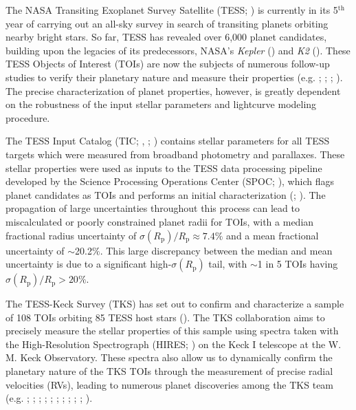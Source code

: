 \documentclass[twocolumn]{aastex63}
\begin{document}
The NASA Transiting Exoplanet Survey Satellite (TESS; \citealt{Ricker15}) is currently in its 5$^\textrm{th}$ year of carrying out an all-sky survey in search of transiting planets orbiting nearby bright stars. So far, TESS has revealed over 6,000 planet candidates, building upon the legacies of its predecessors, NASA's \textit{Kepler} (\citealt{Borucki10}) and \textit{K2} (\citealt{Howell14}). These TESS Objects of Interest (TOIs) are now the subjects of numerous follow-up studies to verify their planetary nature and measure their properties (e.g. \citealt{Kane21}; \citealt{Teske21}; \citealt{Chontos22}; \citealt{Yee22}). The precise characterization of planet properties, however, is greatly dependent on the robustness of the input stellar parameters and lightcurve modeling procedure. 

The TESS Input Catalog (TIC; \citealt{Stassun18}, \citealt{Stassun19}; \citealt{https://doi.org/10.26134/exofop3}) contains stellar parameters for all TESS targets which were measured from broadband photometry and parallaxes. These stellar properties were used as inputs to the TESS data processing pipeline developed by the Science Processing Operations Center (SPOC; \citealt{Jenkins16}), which flags planet candidates as TOIs and performs an initial characterization (\citealt{Guerrero21}; \citealt{toi}). The propagation of large uncertainties throughout this process can lead to miscalculated or poorly constrained planet radii for TOIs, with a median fractional radius uncertainty of $\sigma(R_\textrm{p})/R_\textrm{p} \approx 7.4\%$ and a mean fractional uncertainty of $\sim$20.2$\%$. This large discrepancy between the median and mean uncertainty is due to a significant high-$\sigma(R_\textrm{p})$ tail, with $\sim$1 in 5 TOIs having $\sigma(R_\textrm{p})/R_\textrm{p} > 20\%$.

The TESS-Keck Survey (TKS) has set out to confirm and characterize a sample of 108 TOIs orbiting 85 TESS host stars (\citealt{Chontos22}). The TKS collaboration aims to precisely measure the stellar properties of this sample using spectra taken with the High-Resolution Spectrograph (HIRES; \citealt{Vogt94}) on the Keck I telescope at the W. M. Keck Observatory. These spectra also allow us to dynamically confirm the planetary nature of the TKS TOIs through the measurement of precise radial velocities (RVs), leading to numerous planet discoveries among the TKS team (e.g. \citealt{Dalba20}; \citealt{Dai20}; \citealt{Weiss21}; \citealt{Rubenzahl21}; \citealt{Scarsdale21}; \citealt{MacDougall21}; \citealt{Dalba22}; \citealt{Lubin22}; \citealt{Turtelboom22}; \citealt{MacDougall22}; \citealt{VanZandt22}).
\end{document}
